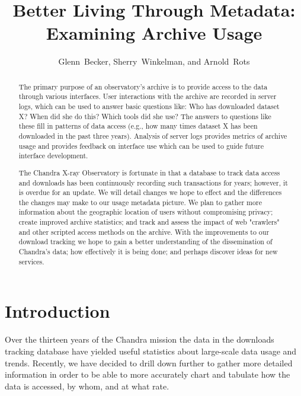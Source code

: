 
\resetcounters




\title{Better Living Through Metadata: Examining Archive Usage}
\author{Glenn~Becker, Sherry~Winkelman, and Arnold~Rots}


\begin{abstract}
The primary purpose of an observatory's archive is to provide access to the data through various interfaces. User interactions with the archive are recorded in server logs, which can be used to answer basic questions like: Who has downloaded dataset X? When did she do this? Which tools did she use? The answers to questions like these fill in patterns of data access (e.g., how many times dataset X has been downloaded in the past three years). Analysis of server logs provides metrics of archive usage and provides feedback on interface use which can be used to guide future interface development.

The Chandra X-ray Observatory is fortunate in that a database to track data access and downloads has been continuously recording such transactions for years; however, it is overdue for an update. We will detail changes we hope to effect and the differences the changes may make to our usage metadata picture. We plan to gather more information about the geographic location of users without compromising privacy; create improved archive statistics; and track and assess the impact of web "crawlers" and other scripted access methods on the archive. With the improvements to our download tracking we hope to gain a better understanding of the dissemination of Chandra's data; how effectively it is being done; and perhaps discover ideas for new services.
\end{abstract}

\section{Introduction}

Over the thirteen years of the Chandra mission the data in the downloads tracking database have yielded useful statistics about large-scale data usage and trends. Recently, we have decided to drill down further to gather more detailed information in order to be able to more accurately chart and tabulate how the data is accessed, by whom, and at what rate.

